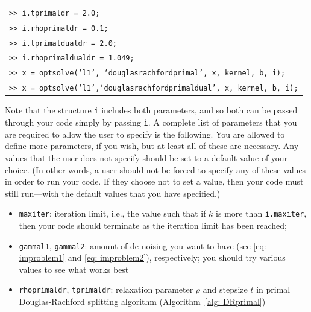 \documentclass[12pt]{article}
\begin{document}
\begin{itemize}
\begin{center}
\begin{tabular}{l}
  \texttt{>> i.tprimaldr = 2.0;}\\
  \texttt{>> i.rhoprimaldr = 0.1;}\\
  \texttt{>> i.tprimaldualdr = 2.0;}\\
  \texttt{>> i.rhoprimaldualdr = 1.049;}\\
   \texttt{>> x = optsolve(`l1', `douglasrachfordprimal', x, kernel, b, i);}\\
  \texttt{>> x = optsolve(`l1',`douglasrachfordprimaldual', x, kernel, b, i);}
  \end{tabular} \end{center}
  Note that the structure \texttt{i} includes both parameters, and so both can be passed through your code simply by passing \texttt{i}. 
  A complete list of parameters that you are required to allow the user to specify is the following.  You are allowed to define more parameters, if you wish, but at least all of these are necessary.  Any values that the user does not specify should be set to a default value of your choice.  (In other words, a user should not be forced to specify any of these values in order to run your code.  If they choose not to set a value, then your code must still run---with the default values that you have specified.)
  \begin{itemize}
    \item \texttt{maxiter}: iteration limit, i.e., the value such that if $k$ is more than \texttt{i.maxiter}, then your code should terminate as the iteration limit has been reached;
    \item \texttt{gammal1}, \texttt{gammal2}: amount of de-noising you want to have (see \eqref{eq: improblem1} and \eqref{eq: improblem2}), respectively; you should try various values to see what works best
    \item \texttt{rhoprimaldr}, \texttt{tprimaldr}: relaxation parameter $\rho$ and stepsize $t$ in primal Douglas-Rachford splitting algorithm (Algorithm~\ref{alg: DRprimal})

\end{itemize}
\end{itemize}
\end{document}
